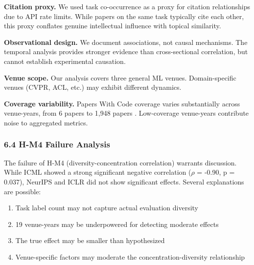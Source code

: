 \textbf{Citation proxy.} We used task co-occurrence as a proxy for citation relationships due to API rate limits. While papers on the same task typically cite each other, this proxy conflates genuine intellectual influence with topical similarity.

\textbf{Observational design.} We document associations, not causal mechanisms. The temporal analysis provides stronger evidence than cross-sectional correlation, but cannot establish experimental causation.

\textbf{Venue scope.} Our analysis covers three general ML venues. Domain-specific venues (CVPR, ACL, etc.) may exhibit different dynamics.

\textbf{Coverage variability.} Papers With Code coverage varies substantially across venue-years, from 6 papers \citep{ICML2024} to 1,948 papers \citep{NeurIPS2021}. Low-coverage venue-years contribute noise to aggregated metrics.

\subsubsection{6.4 H-M4 Failure Analysis}

The failure of H-M4 (diversity-concentration correlation) warrants discussion. While ICML showed a strong significant negative correlation ($\rho$ = -0.90, p = 0.037), NeurIPS and ICLR did not show significant effects. Several explanations are possible:

\begin{enumerate}
\item Task label count may not capture actual evaluation diversity
\item 19 venue-years may be underpowered for detecting moderate effects
\item The true effect may be smaller than hypothesized
\item Venue-specific factors may moderate the concentration-diversity relationship
\end{enumerate}

